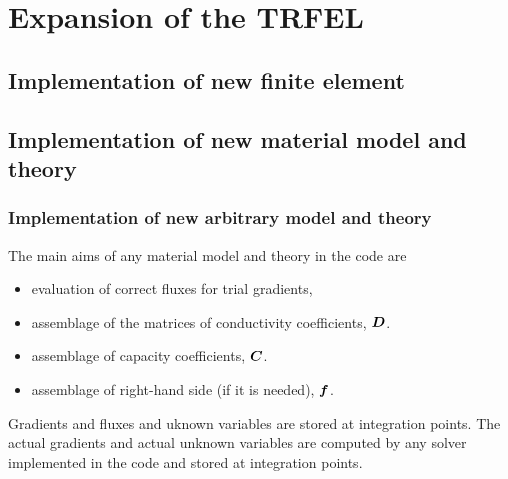 \chapter{Expansion of the TRFEL}
\section{Implementation of new finite element}
\section{Implementation of new material model and theory}
\subsection{Implementation of new arbitrary model and theory}
The main aims of any material model and theory in the code are
\begin{itemize}
\item{evaluation of correct fluxes for trial gradients,}
\item{assemblage of the matrices of conductivity coefficients, $\mbox{\boldmath$D$}$.}
\item{assemblage of capacity coefficients, $\mbox{\boldmath$C$}$.}
\item{assemblage of right-hand side (if it is needed), $\mbox{\boldmath$f$}$.}
\end{itemize}

Gradients and fluxes and uknown variables are stored at integration points. The actual gradients and actual unknown variables 
are computed by any solver implemented in the code and stored at integration points. 

